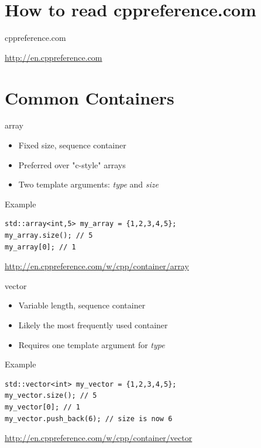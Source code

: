 \documentclass{beamer}
\begin{document}
\section{How to read cppreference.com}

\begin{frame}{cppreference.com}
	\begin{center}
		\url{http://en.cppreference.com}
	\end{center}
\end{frame}


\section{Common Containers}

\begin{frame}[fragile]{array}
	\begin{itemize}
		\item Fixed size, sequence container
		\item Preferred over "c-style" arrays
		\item Two template arguments: \textit{type} and \textit{size}
	\end{itemize}
	\bigskip
	\begin{exampleblock}{Example}
\begin{verbatim}
std::array<int,5> my_array = {1,2,3,4,5};
my_array.size(); // 5
my_array[0]; // 1
\end{verbatim}
	\end{exampleblock}
	\bigskip
	\begin{center}
	\tiny \url{http://en.cppreference.com/w/cpp/container/array}
	\end{center}
\end{frame}

\begin{frame}[fragile]{vector}
	\begin{itemize}
		\item Variable length, sequence container
		\item Likely the most frequently used container
		\item Requires one template argument for \textit{type}
	\end{itemize}
	\bigskip
	\begin{exampleblock}{Example}
\begin{verbatim}
std::vector<int> my_vector = {1,2,3,4,5};
my_vector.size(); // 5
my_vector[0]; // 1
my_vector.push_back(6); // size is now 6
\end{verbatim}
	\end{exampleblock}
	\bigskip
	\begin{center}
	\tiny \url{http://en.cppreference.com/w/cpp/container/vector}
	\end{center}
\end{frame}
\end{document}
